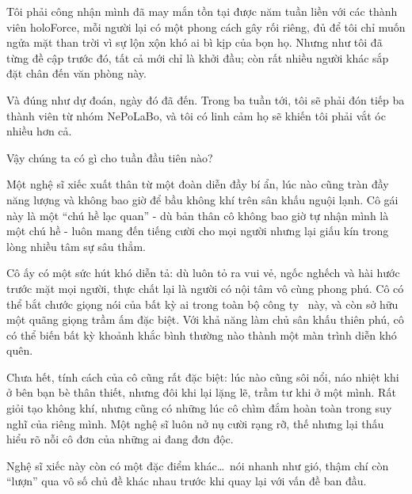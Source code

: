 \documentclass[../main.tex]{subfiles}
\begin{document}


Tôi phải công nhận mình đã may mắn tồn tại được năm tuần liền với các thành viên holoForce, mỗi người lại có một phong cách gây rối riêng, đủ để tôi chỉ muốn ngửa mặt than trời vì sự lộn xộn khó ai bì kịp của bọn họ. Nhưng như tôi đã từng đề cập trước đó, tất cả mới chỉ là khởi đầu; còn rất nhiều người khác sắp đặt chân đến văn phòng này.

Và đúng như dự đoán, ngày đó đã đến. Trong ba tuần tới, tôi sẽ phải đón tiếp ba thành viên từ nhóm NePoLaBo, và tôi có linh cảm họ sẽ khiến tôi phải vắt óc nhiều hơn cả.

Vậy chúng ta có gì cho tuần đầu tiên nào?

Một nghệ sĩ xiếc xuất thân từ một đoàn diễn đầy bí ẩn, lúc nào cũng tràn đầy năng lượng và không bao giờ để bầu không khí trên sân khấu nguội lạnh. Cô gái này là một ``chú hề lạc quan'' - dù bản thân cô không bao giờ tự nhận mình là một chú hề - luôn mang đến tiếng cười cho mọi người nhưng lại giấu kín trong lòng nhiều tâm sự sâu thẳm.

Cô ấy có một sức hút khó diễn tả: dù luôn tỏ ra vui vẻ, ngốc nghếch và hài hước trước mặt mọi người, thực chất lại là người có nội tâm vô cùng phong phú. Cô có thể bắt chước giọng nói của bất kỳ ai trong toàn bộ công ty \hll\ này, và còn sở hữu một quãng giọng trầm ấm đặc biệt. Với khả năng làm chủ sân khấu thiên phú, cô có thể biến bất kỳ khoảnh khắc bình thường nào thành một màn trình diễn khó quên.

Chưa hết, tính cách của cô cũng rất đặc biệt: lúc nào cũng sôi nổi, náo nhiệt khi ở bên bạn bè thân thiết, nhưng đôi khi lại lặng lẽ, trầm tư khi ở một mình. Rất giỏi tạo không khí, nhưng cũng có những lúc cô chìm đắm hoàn toàn trong suy nghĩ của riêng mình. Một nghệ sĩ luôn nở nụ cười rạng rỡ, thế nhưng lại thấu hiểu rõ nỗi cô đơn của những ai đang đơn độc.

Nghệ sĩ xiếc này còn có một đặc điểm khác\dots\ nói nhanh như gió, thậm chí còn ``lượn'' qua vô số chủ đề khác nhau trước khi quay lại với vấn đề ban đầu.
\end{document}
